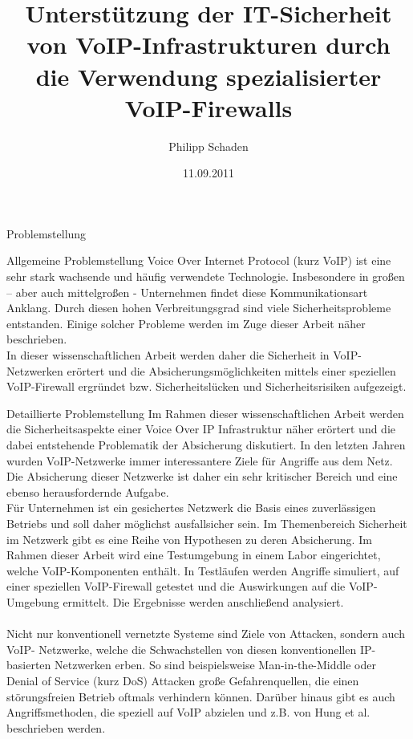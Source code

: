 \documentclass[a4paper,11pt,ngerman]{INSOexpose}
\title{Unterstützung der IT-Sicherheit von VoIP-Infrastrukturen durch die Verwendung spezialisierter VoIP-Firewalls}
\author{Philipp Schaden}
\date{11.09.2011}
\begin{document}
\maketitle

\begin{section}{Problemstellung}
\begin{subsection}{Allgemeine Problemstellung}
Voice Over Internet Protocol (kurz VoIP) ist eine sehr stark wachsende und häufig verwendete Technologie. Insbesondere in großen – aber auch mittelgroßen - Unternehmen findet diese Kommunikationsart Anklang.
Durch diesen hohen Verbreitungsgrad sind viele Sicherheitsprobleme entstanden.
Einige solcher Probleme werden im Zuge dieser Arbeit näher beschrieben.
\\
In dieser wissenschaftlichen Arbeit werden daher die Sicherheit in VoIP-Netzwerken erörtert und die Absicherungsmöglichkeiten mittels einer speziellen VoIP-Firewall ergründet bzw. Sicherheitslücken und Sicherheitsrisiken aufgezeigt.
\end{subsection}
\begin{subsection}{Detaillierte Problemstellung}
Im Rahmen dieser wissenschaftlichen Arbeit werden die Sicherheitsaspekte einer Voice Over IP Infrastruktur näher erörtert und die dabei entstehende Problematik der Absicherung diskutiert.
In den letzten Jahren wurden VoIP-Netzwerke immer interessantere Ziele für Angriffe aus dem Netz. Die Absicherung dieser Netzwerke ist daher ein sehr kritischer Bereich und eine ebenso herausfordernde Aufgabe.
\\
Für Unternehmen ist ein gesichertes Netzwerk die Basis eines zuverlässigen Betriebs und soll daher möglichst ausfallsicher sein.
Im Themenbereich Sicherheit im Netzwerk gibt es eine Reihe von Hypothesen zu deren Absicherung. Im Rahmen dieser Arbeit wird eine Testumgebung in einem Labor eingerichtet, welche VoIP-Komponenten enthält. In Testläufen werden Angriffe simuliert, auf einer speziellen VoIP-Firewall getestet und die Auswirkungen auf die VoIP-Umgebung ermittelt.
Die Ergebnisse werden anschließend analysiert.
\\
\\
Nicht nur konventionell vernetzte Systeme sind Ziele von Attacken, sondern auch VoIP- Netzwerke, welche die Schwachstellen von diesen konventionellen IP-basierten Netzwerken erben.
So sind beispielsweise Man-in-the-Middle oder Denial of Service (kurz DoS) Attacken große Gefahrenquellen, die einen störungsfreien Betrieb oftmals verhindern können. Darüber hinaus gibt es auch Angriffsmethoden, die speziell auf VoIP abzielen und z.B. von Hung et al. beschrieben werden.
\cite{Hung:2006:seciss} \\ 
\end{subsection}
\end{section}
\pagebreak
\end{document}
